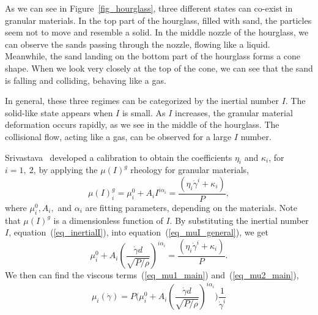 As we can see in Figure~\ref{fig_hourglass}, three different states can co-exist in granular materials. 
In the top part of the hourglass, filled with sand, the particles seem not to move and resemble a solid. 
In the middle nozzle of the hourglass, we can observe the sands passing through the nozzle, flowing like a liquid.
Meanwhile, the sand landing on the bottom part of the hourglass forms a cone shape. When we look very closely at the top of the cone, we can see that the sand is falling and colliding, behaving like a gas.
\par
In general, these three regimes can be categorized by the inertial number $I$. The solid-like state appears when $I$ is small. As $I$ increases, the granular material deformation occurs rapidly, as we see in the middle of the hourglass. The collisional flow, acting like a gas, can be observed for a large $I$ number. 
\par
 Srivastava~\cite{srivastava_viscometric_2021} developed a calibration to obtain the coefficients $\eta_i$ and $\kappa_i$, for $i = 1, \ 2$, by applying the $\mu(I)^g$ rheology for granular materials,
\begin{equation}
  \mu(I)_i^g = \mu_i^0 + A_i{ I}^{ i \alpha_i} =  \frac{(\eta_i \dot{\gamma}^i + \kappa_i)}{P},
\label{eq_muI_general}
\end{equation}
where $\mu_i^0, A_i,$ and $\alpha_i$ are fitting parameters, depending on the materials. Note that $\mu(I)^g$ is a dimensionless function of $I$.
By substituting the inertial number $I$, equation~(\ref{eq_inertialI}), into equation~(\ref{eq_muI_general}),
we get
\begin{equation}
 \mu_i^0 + A_i {\left(  \frac{\dot{\gamma} d }{\sqrt{P/\rho}}\right) }^{ i \alpha_i} =  \frac{(\eta_i \dot{\gamma}^i + \kappa_i)}{P}.
\label{eq_muI_I}
\end{equation}
We then can find the viscous terms~(\ref{eq_mu1_main}) and~(\ref{eq_mu2_main}),
\begin{equation}
  \mu_i  (\dot{\gamma})= 
 P \Biggl( \mu_i^0 + A_i {\left(  \frac{\dot{\gamma} d }{\sqrt{P/\rho}}\right) }^{ i \alpha_i}\Biggr) 
   \frac{1}{\dot{\gamma}^i}
\label{eq_eta1}
\end{equation}


